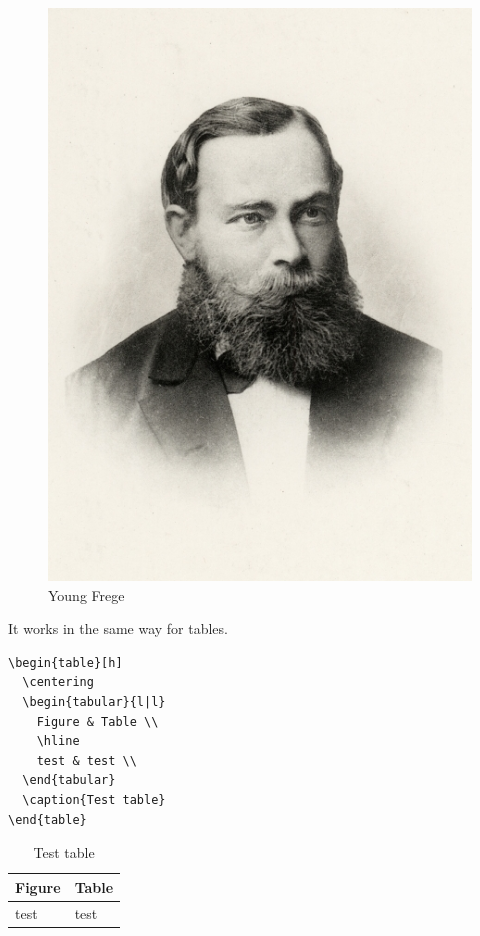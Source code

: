 \begin{figure}[h]
	\centering
	\includegraphics[scale=.45]{graphics/Young-Frege}
	\caption{Young Frege}
	\label{fig:Frege}
\end{figure}


\noindent It works in the same way for tables.


\begin{lstlisting}
\begin{table}[h]
  \centering
  \begin{tabular}{l|l}
    Figure & Table \\
    \hline
    test & test \\
  \end{tabular}
  \caption{Test table}
\end{table}
\end{lstlisting}


\begin{table}[h]
	\centering
	\begin{tabular}{l|l}
		Figure & Table \\
		\hline
		test & test \\
	\end{tabular}
	\caption{Test table}
\end{table}


